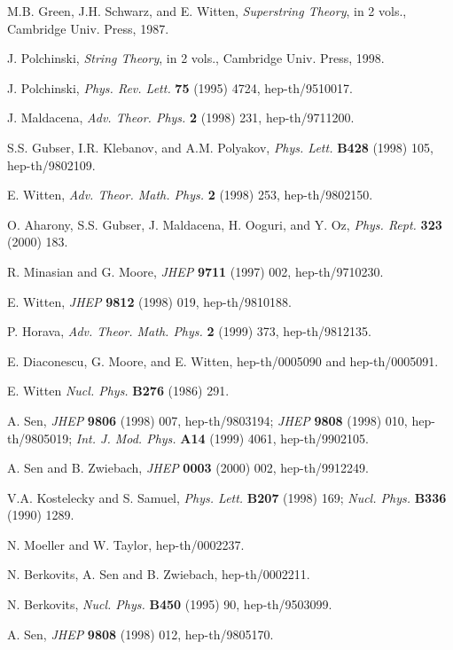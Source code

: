 \documentclass[a4paper,12pt]{article}
\begin{document}
\begin{thebibliography}{99}

 M.B. Green, J.H. Schwarz, and E. Witten, {\it Superstring Theory},
in 2 vols., Cambridge Univ. Press, 1987.


 J. Polchinski, {\it String Theory}, in 2 vols., Cambridge Univ. Press, 1998.

 J. Polchinski, {\it Phys. Rev. Lett.} {\bf 75} (1995) 4724, hep-th/9510017.

 J. Maldacena, {\it Adv. Theor. Phys.} {\bf 2} (1998) 231, hep-th/9711200.

 S.S. Gubser, I.R. Klebanov, and A.M. Polyakov, {\it Phys. Lett.}
{\bf B428} (1998) 105, hep-th/9802109.

 E. Witten, {\it Adv. Theor. Math. Phys.} {\bf 2} (1998) 253, hep-th/9802150.

 O. Aharony, S.S. Gubser, J. Maldacena, H. Ooguri, and Y. Oz,
{\it Phys. Rept.} {\bf 323} (2000) 183.

 R. Minasian and G. Moore, {\it JHEP} {\bf 9711} (1997) 002, hep-th/9710230.

 E. Witten, {\it JHEP} {\bf 9812} (1998) 019, hep-th/9810188.

 P. Horava, {\it Adv. Theor. Math. Phys.} {\bf 2} (1999) 373, hep-th/9812135.

 E. Diaconescu, G. Moore, and E. Witten, hep-th/0005090 and hep-th/0005091.

 E. Witten {\it Nucl. Phys.} {\bf B276} (1986) 291.

 A. Sen, {\it JHEP} {\bf 9806} (1998) 007, hep-th/9803194;
{\it JHEP} {\bf 9808} (1998) 010, hep-th/9805019; {\it Int. J.
Mod. Phys.} {\bf A14} (1999) 4061, hep-th/9902105.

 A. Sen and B. Zwiebach, {\it JHEP} {\bf 0003} (2000) 002, hep-th/9912249.

 V.A. Kostelecky and S. Samuel, {\it Phys. Lett.} {\bf B207} (1998)
169; {\it Nucl. Phys.} {\bf B336} (1990) 1289.

 N. Moeller and W. Taylor, hep-th/0002237.

 N. Berkovits, A. Sen and B. Zwiebach, hep-th/0002211.

 N. Berkovits, {\it Nucl. Phys. } {\bf B450} (1995) 90, hep-th/9503099.

 A. Sen, {\it JHEP} {\bf 9808} (1998) 012,
hep-th/9805170.


\end{thebibliography}
\end{document}
